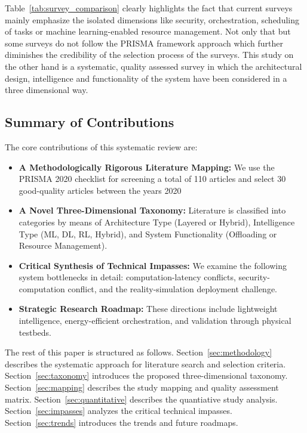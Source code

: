 \documentclass[conference]{IEEEtran}
\begin{document}
Table~\ref{tab:survey_comparison} clearly highlights the fact that current surveys mainly emphasize the isolated dimensions like security, orchestration, scheduling of tasks or machine learning-enabled resource management. Not only that but some surveys do not follow the PRISMA framework approach which further diminishes the credibility of the selection process of the surveys. This study on the other hand is a systematic, quality assessed survey in which the architectural design, intelligence and functionality of the system have been considered in a three dimensional way.


\subsection{Summary of Contributions}
The core contributions of this systematic review are:
\begin{itemize}
    \item \textbf{A Methodologically Rigorous Literature Mapping:} We use the PRISMA 2020 checklist for screening a total of 110 articles and select 30 good-quality articles between the years 2020
    \item \textbf{A Novel Three-Dimensional Taxonomy:} Literature is classified into categories by means of Architecture Type (Layered or Hybrid), Intelligence Type (ML, DL, RL, Hybrid), and System Functionality (Offloading or Resource Management).

    \item \textbf{Critical Synthesis of Technical Impasses:} We examine the following system bottlenecks in detail: computation-latency conflicts, security-computation conflict, and the reality-simulation deployment challenge.
    \item \textbf{Strategic Research Roadmap:} These directions include lightweight intelligence, energy-efficient orchestration, and validation through physical testbeds.
\end{itemize}


The rest of this paper is structured as follows. Section~\ref{sec:methodology} describes the systematic approach for literature search and selection criteria. Section~\ref{sec:taxonomy} introduces the proposed three-dimensional taxonomy. Section~\ref{sec:mapping} describes the study mapping and quality assessment matrix. Section~\ref{sec:quantitative} describes the quantiative study analysis. Section~\ref{sec:impasses} analyzes the critical technical impasses. Section~\ref{sec:trends} introduces the trends and future roadmaps.
\end{document}
